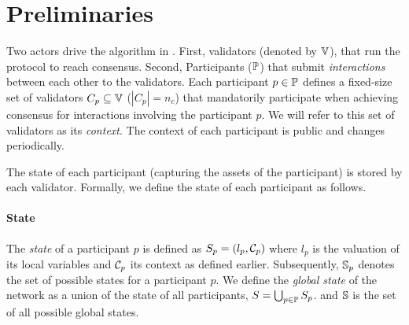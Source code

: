 \section{Preliminaries}\label{sec:preliminaries}

Two actors drive the algorithm in \codename{}. First, validators (denoted by $\mathbb{V}$), that run the protocol to reach consensus. Second, Participants ($\mathbb{P}$) that submit \textit{interactions} between each other to the validators. Each participant $p \in \mathbb{P}$ defines a fixed-size set of validators $C_p \subseteq \mathbb{V}$ ($|C_p| = n_c$) that mandatorily participate when achieving consensus for interactions involving the participant $p$. We will refer to this set of validators as its \textit{context}. The context of each participant is public and changes periodically.




The state of each participant (capturing the assets of the participant) is stored by each validator. 
Formally, we define the state of each participant as follows. 

\paragraph{\textbf{State}}
The \emph{state} of a participant $p$ is defined as $S_p = (l_p, \mathcal{C}_p)$ where $l_p$ is the valuation of its local variables and $\mathcal{C}_p$ its context as defined earlier. 
Subsequently, $\mathbb{S}_p$ denotes the set of possible states for a participant $p$.
We define the \emph{global state} of the network as a union of the state of all participants, $S = \bigcup_{p\in\mathbb{P}} S_p$. and $\mathbb{S}$ is the set of all possible global states.


